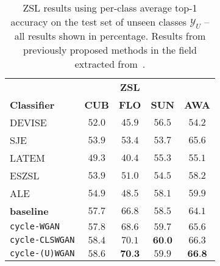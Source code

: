 \begin{table}
\centering
\caption{ZSL results using per-class average top-1 accuracy on the test set of unseen classes $\mathcal{Y}_U$ -- all results shown in percentage. Results from previously proposed methods in the field extracted from~\cite{XianCVPR2017}.}
\label{table:zsl_results}
\centering
\begin{tabular}{l|c|c|c|c}
\hline
& & \textbf{ZSL} &
\\
\textbf{Classifier}  
& \textbf{CUB} 
& \textbf{FLO} 
& \textbf{SUN}
& \textbf{AWA }
\\ \hline
DEVISE~\cite{frome2013devise}          & $52.0$ & $45.9$ & $56.5$ & $54.2$ \\
SJE~\cite{akata2015evaluation}         & $53.9$ & $53.4$ & $53.7$ & $65.6$ \\
LATEM~\cite{xian2016latent}            & $49.3$ & $40.4$ & $55.3$ & $55.1$ \\
ESZSL~\cite{romera2015embarrassingly}  & $53.9$ & $51.0$ & $54.5$ & $58.2$ \\
ALE~\cite{akata2016label}              & $54.9$ & $48.5$ & $58.1$ & $59.9$
\\ \hline

\textbf{baseline} \cite{XianCVPR2018} 

& $57.7$ & $66.8$ & $58.5$ & $64.1$
\\

\texttt{cycle-WGAN} 
& $57.8$ & $68.6$ & $59.7$ & $65.6$
\\

\texttt{cycle-CLSWGAN} 
& $58.4$ & $70.1$ & $\textbf{60.0}$ & $66.3$
 \\
 
\texttt{cycle-(U)WGAN} 
& $\mathbf{58.6}$ & $\textbf{70.3}$  & $59.9$ & $\textbf{66.8}$
 \\ \hline
 
 \end{tabular}
\end{table}